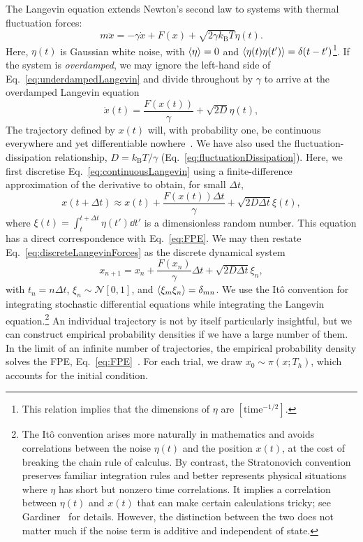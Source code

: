 \documentclass[hyperref={colorlinks=true, urlcolor=blue, citecolor=blue, final, bound}]{sfuthesis}
\newcommand{\kB}{k_{\mathrm{B}}}
\begin{document}
The Langevin equation extends Newton's second law to systems with thermal fluctuation forces:
\begin{equation}
    m\ddot x = -\gamma\dot x + F(x) + \sqrt{2\gamma\kB T}\eta(t).\label{eq:underdampedLangevin}
\end{equation}
Here, $\eta(t)$ is Gaussian white noise, with $\ev{\eta}=0$ and $\ev{\eta(t)\eta(t')}=\delta(t-t')$\footnote{This relation implies that the dimensions of $\eta$ are $[\mathrm{time^{-1/2}}]$.}. If the system is \textit{overdamped}, we may ignore the left-hand side of Eq.~\ref{eq:underdampedLangevin} and divide throughout by $\gamma$ to arrive at the overdamped Langevin equation
\begin{equation}
    \dot x(t) = \frac{F(x(t))}{\gamma} + \sqrt{2D}\eta(t),\label{eq:continuousLangevin}
\end{equation}
The trajectory defined by $x(t)$ will, with probability one, be continuous everywhere and yet differentiable nowhere~\cite{Gusak2009}. We have also used the fluctuation-dissipation relationship, $D=\kB T/\gamma$ (Eq.~\ref{eq:fluctuationDissipation}). Here, we first discretise Eq.~\ref{eq:continuousLangevin} using a finite-difference approximation of the derivative to obtain, for small $\Delta t$,
\begin{equation}
    x(t+\Delta t) \approx x(t) + \frac{F(x(t))\Delta t}{\gamma} + \sqrt{2D\Delta t}\xi(t), \label{eq:discreteLangevinForces}
\end{equation}
where $\xi(t) = \int_t^{t+\Delta t}\eta(t')\dd{t'}$ is a dimensionless random number. This equation has a direct correspondence with Eq.~\ref{eq:FPE}. We may then restate Eq.~\ref{eq:discreteLangevinForces} as the discrete dynamical system
\begin{equation}
    x_{n+1} = x_n + \frac{F(x_n)}{\gamma}\Delta t + \sqrt{2D\Delta t}\xi_n, \label{eq:discreteLangevin}
\end{equation}
with $t_n = n\Delta t$, $\xi_n\sim\mathcal N[0,1]$, and $\ev{\xi_m\xi_n}=\delta_{mn}$. We use the It\^o convention for integrating stochastic differential equations while integrating the Langevin equation.\footnote{The It\^o convention arises more naturally in mathematics and avoids correlations between the noise $\eta(t)$ and the position $x(t)$, at the cost of breaking the chain rule of calculus. By contrast, the Stratonovich convention preserves familiar integration rules and better represents physical situations where $\eta$ has short but nonzero time correlations. It implies a correlation between $\eta(t)$ and $x(t)$ that can make certain calculations tricky; see Gardiner~\cite[Ch.~7]{Gardiner2021} for details. However, the distinction between the two does not matter much if the noise term is additive and independent of state.} An individual trajectory is not by itself particularly insightful, but we can construct empirical probability densities if we have a large number of them. In the limit of an infinite number of trajectories, the empirical probability density solves the FPE, Eq.~\ref{eq:FPE}~\cite{vanKampen2011}. For each trial, we draw $x_0\sim \pi(x;T_h)$, which accounts for the initial condition. 
\end{document}
